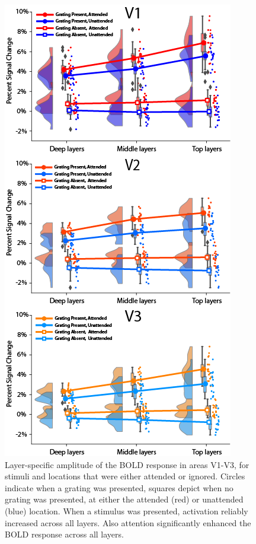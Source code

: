 \documentclass[9pt,lineno]{aperture}
\begin{document}
\begin{figure}
\includegraphics[width=0.6\linewidth]{img/layer_region_stats_600.png}
\caption{Layer-specific amplitude of the BOLD response in areas V1-V3, for stimuli and locations that were either attended or ignored. Circles indicate when a grating was presented, squares depict when no grating was presented, at either the attended (red) or unattended (blue) location. When a stimulus was presented, activation reliably increased across all layers. Also attention significantly enhanced the BOLD response across all layers.}
\label{fig:layer_region_stats_600}


\end{figure}
\end{document}
